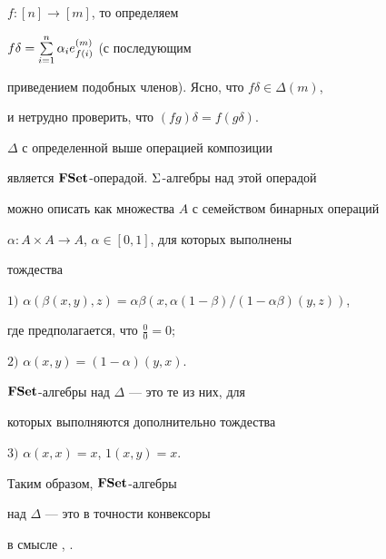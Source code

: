 $f:[n]\to [m]$, то определяем


$f\delta=\sum\limits_{i=1}^n \alpha_i e_{f(i)}^{(m)}$ (с последующим


приведением подобных членов). Ясно, что $f\delta\in \Delta(m)$,


и нетрудно проверить, что $(fg)\delta=f(g\delta)$.





\begin{thm}


$\Delta$ с определенной выше операцией композиции


является ${\bold F}\bold{Set}$-операдой. $\Sigma$-алгебры над этой операдой


можно описать как множества $A$ с семейством бинарных операций


$\alpha: A\times A\to A$, $\alpha\in [0,1]$, для которых выполнены


тождества





$1)$ $ \alpha(\beta(x,y),z)


=\alpha\beta(x,\alpha(1-\beta)/(1-\alpha\beta)(y,z))$,


где предполагается, что $\frac{0}{0}=0;$





$2)$ $\alpha(x,y)=(1-\alpha)(y,x)$.





${\bold F}\bold{Set}$-алгебры над $\Delta$ --- это те из них, для


которых выполняются дополнительно тождества





$3)$ $\alpha(x,x)=x$, $1(x,y)=x$.


\end{thm}





Таким образом, ${\bold F}\bold{Set}$-алгебры


над $\Delta$ --- это в точности конвексоры


в смысле \cite{Sc1}, \cite{Sc2}.






